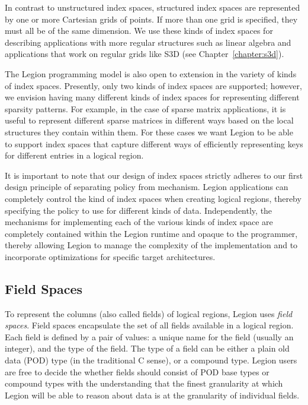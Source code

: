 In contrast to unstructured index spaces, structured
index spaces are represented by one or more 
Cartesian grids of points. If more than one grid
is specified, they must all be of the same dimension.
We use these kinds of index spaces for describing
applications with more regular structures such
as linear algebra and applications that work on
regular grids like S3D (see Chapter~\ref{chapter:s3d}).

The Legion programming model is also open to extension
in the variety of kinds of index spaces.  Presently, 
only two kinds of index spaces are supported; however, we envision 
having many different kinds of index spaces for 
representing different sparsity patterns. For example,
in the case of sparse matrix applications, it
is useful to represent different sparse matrices
in different ways based on the local structures
they contain within them. For these cases we want
Legion to be able to support index spaces that
capture different ways of efficiently representing
keys for different entries in a logical region.

It is important to note that our design of index
spaces strictly adheres to our first design principle
of separating policy from mechanism. Legion
applications can completely control the
kind of index spaces when creating logical regions,
thereby specifying the policy to use for different
kinds of data. Independently, the mechanisms for
implementing each of the various kinds of index
space are completely contained within the Legion 
runtime and opaque to the programmer, thereby
allowing Legion to manage the complexity of the
implementation and to incorporate optimizations
for specific target architectures.

\subsection{Field Spaces}
\label{subsec:fieldspace}
To represent the columns (also called fields) of 
logical regions, Legion uses {\em field spaces}. 
Field spaces encapsulate the set of all fields
available in a logical region. Each field is
defined by a pair of values: a unique name
for the field (usually an integer), and the
type of the field.  The type of a field can 
be either a plain old data (POD) type (in the 
traditional C sense), or a compound type. Legion 
users are free to decide the whether fields should 
consist of POD base types or compound types with
the understanding that the finest granularity at
which Legion will be able to reason about data
is at the granularity of individual fields. 

